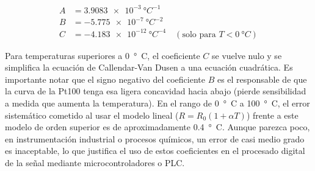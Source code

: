 \begin{equation} \label{eq:coef_cv}
\begin{split}
    A &= \qty{3.9083e-3}{\degree C^{-1}} \\
    B &= \qty{-5.775e-7}{\degree C^{-2}} \\
    C &= \qty{-4.183e-12}{\degree C^{-4}} \quad (\text{solo para } T < \qty{0}{\degree C})
\end{split}
\end{equation}

Para temperaturas superiores a \qty{0}{\degree C}, el coeficiente $C$  se vuelve nulo y se simplifica  la ecuación de Callendar-Van Dusen a una ecuación cuadrática. Es importante notar que el signo negativo del coeficiente $B$ es el responsable de que la curva de la Pt100 tenga esa ligera concavidad hacia abajo (pierde sensibilidad a medida que aumenta la temperatura). En el rango de \qty{0}{\degree C} a \qty{100}{\degree C}, el error sistemático cometido al usar el modelo lineal ($R = R_0(1+\alpha T)$) frente a este modelo de orden superior es de aproximadamente \qty{0,4}{\degree C}. Aunque parezca poco, en instrumentación industrial o procesos químicos, un error de casi medio grado es inaceptable, lo que justifica el uso de estos coeficientes en el procesado digital de la señal mediante microcontroladores o PLC.



